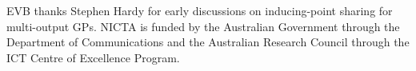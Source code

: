 EVB thanks Stephen Hardy for early discussions on inducing-point sharing for multi-output GPs.
%
NICTA is funded by the Australian Government through the Department of Communications and the Australian Research Council through the ICT Centre of Excellence Program. 
%



